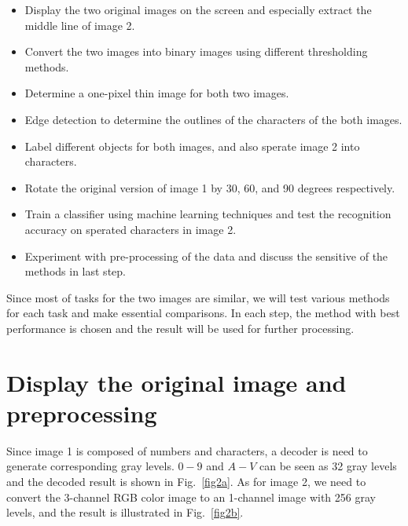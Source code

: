 \documentclass[hyperref]{article}
\theoremstyle{nonumberplain}
\begin{document}
	\begin{itemize}
		\item Display the two original images on the screen and especially extract the middle line of image 2.
		\item Convert the two images into binary images using different thresholding methods.
		\item Determine a one-pixel thin image for both two images.
		\item Edge detection to determine the outlines of the characters of the both images. 
		\item Label different objects for both images, and also sperate image 2 into characters.
		\item Rotate the original version of image 1 by 30, 60, and 90 degrees respectively.
		\item Train a classifier using machine learning techniques and test the recognition accuracy on sperated characters in image 2.
		\item Experiment with pre-processing of the data and discuss the sensitive of the methods in last step.
		
	\end{itemize}
	
	 Since most of tasks for the two images are similar, we will test various methods for each task and make essential comparisons. In each step, the method with best performance is chosen and the result will be used for further processing. 
	 
	 
	\section{Display the original image and preprocessing}
	
	\hspace{1.0em}
	Since image 1 is composed of numbers and characters, a decoder is need to generate corresponding gray levels. $0-9$ and $A-V$ can be seen as 32 gray levels and the decoded result is shown in Fig.~\ref{fig2a}. As for image 2, we need to convert the 3-channel RGB color image to an 1-channel image with 256 gray levels, and the result is illustrated in Fig.~\ref{fig2b}.
	
\end{document}
